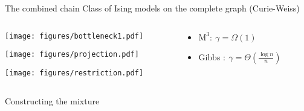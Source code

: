 \documentclass[mathserif]{beamer}
\begin{document}
\begin{frame}{The combined chain}
\vspace{0.5em}
Class of Ising models on the complete graph (Curie-Weiss)

\vspace{1em}
\begin{columns}[t]
\begin{column}{0.3\textwidth}
\centering

\vspace{0.1em}
\texttt{[image: figures/bottleneck1.pdf]}

\vspace{2.5em}
\texttt{[image: figures/projection.pdf]}

\vspace{2em}
\hspace{0.3em}\texttt{[image: figures/restriction.pdf]}
\end{column}

\begin{column}{0.66\textwidth}
\vspace{-1em}

\vspace{1.4em}
\begin{itemize}
\item<4-> $\mathrm{M}^3:\ \gamma = \Omega(1)$ 
\end{itemize}

\vspace{3.2em}
\begin{itemize}
\item<3-> Gibbs $:\ \gamma = \Theta\left( \displaystyle\frac{\log n}{n} \right)$ 
\end{itemize}
\end{column}
\end{columns}

\end{frame}


\begin{frame}{Constructing the mixture}

\end{frame}
\end{document}
